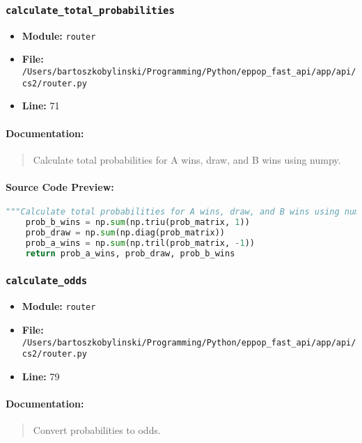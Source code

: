 \documentclass[11pt,a4paper]{article}
\begin{document}
\vspace{1em}
\subsubsection{\texttt{calculate\_total\_probabilities}}

\begin{itemize}
    \item \textbf{Module:} \texttt{router}
    \item \textbf{File:} \texttt{/Users/bartoszkobylinski/Programming/Python/eppop\_fast\_api/app/api/cs2/router.py}
    \item \textbf{Line:} 71
\end{itemize}

\paragraph{Documentation:}
\begin{quote}
Calculate total probabilities for A wins, draw, and B wins using numpy.
\end{quote}

\paragraph{Source Code Preview:}
\begin{lstlisting}[language=Python]
    """Calculate total probabilities for A wins, draw, and B wins using numpy."""
    prob_b_wins = np.sum(np.triu(prob_matrix, 1))
    prob_draw = np.sum(np.diag(prob_matrix))
    prob_a_wins = np.sum(np.tril(prob_matrix, -1))
    return prob_a_wins, prob_draw, prob_b_wins
\end{lstlisting}

\vspace{1em}
\subsubsection{\texttt{calculate\_odds}}

\begin{itemize}
    \item \textbf{Module:} \texttt{router}
    \item \textbf{File:} \texttt{/Users/bartoszkobylinski/Programming/Python/eppop\_fast\_api/app/api/cs2/router.py}
    \item \textbf{Line:} 79
\end{itemize}

\paragraph{Documentation:}
\begin{quote}
Convert probabilities to odds.
\end{quote}
\end{document}
